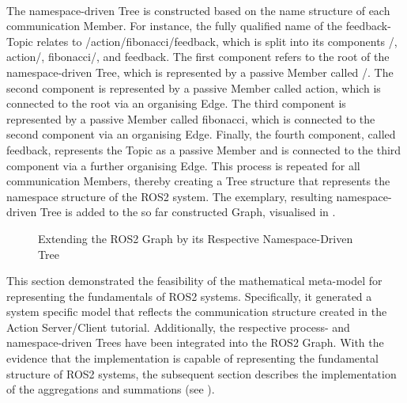 \begin{description}[leftmargin=\descriptionIndent, itemsep=-0.2em]
        \item[6) Integrating the Namespace-Driven Tree] \hfill \\
        The namespace-driven Tree is constructed based on the name structure of each communication Member. For instance, the fully qualified name of the \glqq{}feedback\grqq{}-Topic relates to \glqq{}/action/fibonacci/feedback\grqq{}, which is split into its components \glqq{}/\grqq{}, \glqq{}action/\grqq{}, \glqq{}fibonacci/\grqq{}, and \glqq{}feedback\grqq{}. The first component refers to the root of the namespace-driven Tree, which is represented by a passive Member called \glqq{}/\grqq{}. The second component is represented by a passive Member called \glqq{}action\grqq{}, which is connected to the root via an organising Edge. The third component is represented by a passive Member called \glqq{}fibonacci\grqq{}, which is connected to the second component via an organising Edge. Finally, the fourth component, called \glqq{}feedback\grqq{}, represents the Topic as a passive Member and is connected to the third component via a further organising Edge. This process is repeated for all communication Members, thereby creating a Tree structure that represents the namespace structure of the ROS2 system. The exemplary, resulting namespace-driven Tree is added to the so far constructed Graph, visualised in .
        \begin{figure}[h]
            \centering
            
            \caption[Extending the ROS2 Graph by its Respective Namespace-Driven Tree]{Extending the ROS2 Graph by its Respective Namespace-Driven Tree \circledLegend} \label{fig:neo4j:fullExemplaryGraph}
        \end{figure}
        
    \end{description}

    This section demonstrated the feasibility of the mathematical meta-model for representing the fundamentals of ROS2 systems. Specifically, it generated a system specific model that reflects the communication structure created in the Action Server/Client tutorial. Additionally, the respective process- and namespace-driven Trees have been integrated into the ROS2 Graph.\newline
    With the evidence that the implementation is capable of representing the fundamental structure of ROS2 systems, the subsequent section describes the implementation of the aggregations and summations (see ).

